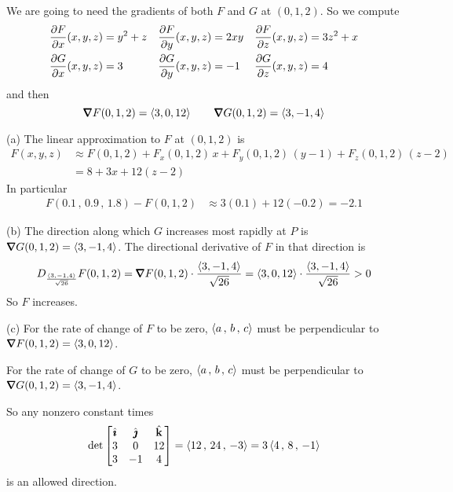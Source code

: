 \begin{solution}
We are going to need the gradients of both $F$ and $G$ at $(0,1,2)$. 
So we compute
\begin{align*}
\pdiff{F}{x}(x,y,z)&=y^2+z &
\pdiff{F}{y}(x,y,z)&=2xy  &
\pdiff{F}{z}(x,y,z)&=3z^2+x \\
\pdiff{G}{x}(x,y,z)&=3 &
\pdiff{G}{y}(x,y,z)&=-1  &
\pdiff{G}{z}(x,y,z)&=4
\end{align*}
and then
\begin{equation*}
\vnabla F(0,1,2) = \llt 3,0,12 \rgt\qquad
\vnabla G(0,1,2) = \llt 3,-1,4 \rgt
\end{equation*}

(a) The linear approximation to $F$ at $(0,1,2)$ is
\begin{align*}
F(x,y,z) 
&\approx F(0,1,2) + F_x(0,1,2)\,x + F_y(0,1,2)\,(y-1) + F_z(0,1,2)\,(z-2) \\
&=8+ 3 x + 12 (z-2)
\end{align*}
In particular
\begin{align*}
F(0.1\,,\,0.9\,,\,1.8) - F(0,1,2)
&\approx 3(0.1) + 12(-0.2)
=-2.1
\end{align*}

(b) The direction along which $G$ increases most rapidly at $P$ is
$\vnabla G(0,1,2) = \llt 3,-1,4 \rgt$. The directional derivative of $F$
in that direction is
\begin{align*}
D_{\frac{\llt 3,-1,4\rgt}{\sqrt{26}}}F(0,1,2) 
 = \vnabla F(0,1,2) \cdot \frac{\llt 3,-1,4\rgt}{\sqrt{26}}
 = \llt 3,0,12 \rgt\cdot \frac{\llt 3,-1,4\rgt}{\sqrt{26}}
 > 0
\end{align*}
So $F$ increases.

(c) 
For the rate of change of $F$ to be zero, 
$\left< a\,,\,b\,,\,c\right>$ must be perpendicular to 
$\vnabla F(0,1,2) = \llt 3,0,12  \rgt$.

For the rate of change of $G$ to be zero, 
$\left< a\,,\,b\,,\,c\right>$ must be perpendicular to 
$\vnabla G(0,1,2) = \llt 3,-1,4 \rgt$.

So any nonzero constant times
\begin{align*}
\det\left[\begin{matrix}
            \hat{\pmb{\imath}}  &  \hat{\pmb{\jmath}}  &  \hat{\mathbf{k}} \\
            3    &   0   &   12 \\
            3    &  -1   &    4 
            \end{matrix}\right]
=\left< 12 \,,\, 24 \,,\, -3 \right>
=3 \left< 4 \,,\, 8 \,,\, -1 \right>
\end{align*}
is an allowed direction.
\end{solution}

